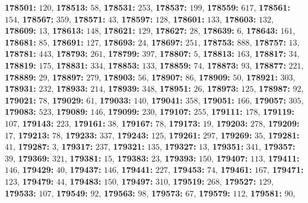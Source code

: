 \textsf{\bfseries 178501:} $120$, \textsf{\bfseries 178513:} $58$, \textsf{\bfseries 178531:} $253$, \textsf{\bfseries 178537:} $199$, \textsf{\bfseries 178559:} $617$, \textsf{\bfseries 178561:} $154$, \textsf{\bfseries 178567:} $359$, \textsf{\bfseries 178571:} $43$, \textsf{\bfseries 178597:} $128$, \textsf{\bfseries 178601:} $133$, \textsf{\bfseries 178603:} $132$, \textsf{\bfseries 178609:} $13$, \textsf{\bfseries 178613:} $148$, \textsf{\bfseries 178621:} $129$, \textsf{\bfseries 178627:} $28$, \textsf{\bfseries 178639:} $6$, \textsf{\bfseries 178643:} $161$, \textsf{\bfseries 178681:} $85$, \textsf{\bfseries 178691:} $127$, \textsf{\bfseries 178693:} $24$, \textsf{\bfseries 178697:} $251$, \textsf{\bfseries 178753:} $888$, \textsf{\bfseries 178757:} $13$, \textsf{\bfseries 178781:} $443$, \textsf{\bfseries 178793:} $261$, \textsf{\bfseries 178799:} $397$, \textsf{\bfseries 178807:} $5$, \textsf{\bfseries 178813:} $163$, \textsf{\bfseries 178817:} $34$, \textsf{\bfseries 178819:} $175$, \textsf{\bfseries 178831:} $334$, \textsf{\bfseries 178853:} $133$, \textsf{\bfseries 178859:} $74$, \textsf{\bfseries 178873:} $93$, \textsf{\bfseries 178877:} $221$, \textsf{\bfseries 178889:} $29$, \textsf{\bfseries 178897:} $279$, \textsf{\bfseries 178903:} $56$, \textsf{\bfseries 178907:} $86$, \textsf{\bfseries 178909:} $50$, \textsf{\bfseries 178921:} $303$, \textsf{\bfseries 178931:} $232$, \textsf{\bfseries 178933:} $214$, \textsf{\bfseries 178939:} $348$, \textsf{\bfseries 178951:} $26$, \textsf{\bfseries 178973:} $125$, \textsf{\bfseries 178987:} $92$, \textsf{\bfseries 179021:} $78$, \textsf{\bfseries 179029:} $61$, \textsf{\bfseries 179033:} $140$, \textsf{\bfseries 179041:} $358$, \textsf{\bfseries 179051:} $166$, \textsf{\bfseries 179057:} $305$, \textsf{\bfseries 179083:} $523$, \textsf{\bfseries 179089:} $146$, \textsf{\bfseries 179099:} $230$, \textsf{\bfseries 179107:} $255$, \textsf{\bfseries 179111:} $178$, \textsf{\bfseries 179119:} $107$, \textsf{\bfseries 179143:} $223$, \textsf{\bfseries 179161:} $38$, \textsf{\bfseries 179167:} $78$, \textsf{\bfseries 179173:} $19$, \textsf{\bfseries 179203:} $278$, \textsf{\bfseries 179209:} $17$, \textsf{\bfseries 179213:} $78$, \textsf{\bfseries 179233:} $337$, \textsf{\bfseries 179243:} $125$, \textsf{\bfseries 179261:} $297$, \textsf{\bfseries 179269:} $35$, \textsf{\bfseries 179281:} $41$, \textsf{\bfseries 179287:} $3$, \textsf{\bfseries 179317:} $237$, \textsf{\bfseries 179321:} $135$, \textsf{\bfseries 179327:} $13$, \textsf{\bfseries 179351:} $341$, \textsf{\bfseries 179357:} $39$, \textsf{\bfseries 179369:} $321$, \textsf{\bfseries 179381:} $15$, \textsf{\bfseries 179383:} $23$, \textsf{\bfseries 179393:} $150$, \textsf{\bfseries 179407:} $113$, \textsf{\bfseries 179411:} $146$, \textsf{\bfseries 179429:} $40$, \textsf{\bfseries 179437:} $146$, \textsf{\bfseries 179441:} $227$, \textsf{\bfseries 179453:} $74$, \textsf{\bfseries 179461:} $167$, \textsf{\bfseries 179471:} $123$, \textsf{\bfseries 179479:} $44$, \textsf{\bfseries 179483:} $150$, \textsf{\bfseries 179497:} $310$, \textsf{\bfseries 179519:} $268$, \textsf{\bfseries 179527:} $129$, \textsf{\bfseries 179533:} $107$, \textsf{\bfseries 179549:} $92$, \textsf{\bfseries 179563:} $98$, \textsf{\bfseries 179573:} $67$, \textsf{\bfseries 179579:} $112$, \textsf{\bfseries 179581:} $90$, 
